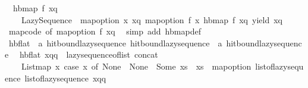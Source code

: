 \begin{isabellebody}
\ \ {\isachardoublequoteopen}hb{\isacharunderscore}{\kern0pt}map\ f\ xq\ {\isacharequal}{\kern0pt}\isanewline
\ \ \ \ Lazy{\isacharunderscore}{\kern0pt}Sequence\ {\isacharparenleft}{\kern0pt}{\isasymlambda}{\isacharunderscore}{\kern0pt}{\isachardot}{\kern0pt}\ map{\isacharunderscore}{\kern0pt}option\ {\isacharparenleft}{\kern0pt}{\isasymlambda}{\isacharparenleft}{\kern0pt}x{\isacharcomma}{\kern0pt}\ xq{\isacharprime}{\kern0pt}{\isacharparenright}{\kern0pt}{\isachardot}{\kern0pt}\ {\isacharparenleft}{\kern0pt}map{\isacharunderscore}{\kern0pt}option\ f\ x{\isacharcomma}{\kern0pt}\ hb{\isacharunderscore}{\kern0pt}map\ f\ xq{\isacharprime}{\kern0pt}{\isacharparenright}{\kern0pt}{\isacharparenright}{\kern0pt}\ {\isacharparenleft}{\kern0pt}yield\ xq{\isacharparenright}{\kern0pt}{\isacharparenright}{\kern0pt}{\isachardoublequoteclose}\isanewline
%
\isadelimproof
\ \ %
\endisadelimproof
%
\isatagproof
{}\isamarkupfalse%
\ map{\isacharunderscore}{\kern0pt}code\ {\isacharbrackleft}{\kern0pt}of\ {\isachardoublequoteopen}map{\isacharunderscore}{\kern0pt}option\ f{\isachardoublequoteclose}\ xq{\isacharbrackright}{\kern0pt}\ \isamarkupfalse%
\ {\isacharparenleft}{\kern0pt}simp\ add{\isacharcolon}{\kern0pt}\ hb{\isacharunderscore}{\kern0pt}map{\isacharunderscore}{\kern0pt}def{\isacharparenright}{\kern0pt}%
\endisatagproof
{\isafoldproof}%
%
\isadelimproof
\isanewline
%
\endisadelimproof
\isanewline
{}\isamarkupfalse%
\ hb{\isacharunderscore}{\kern0pt}flat\ {\isacharcolon}{\kern0pt}{\isacharcolon}{\kern0pt}\ {\isachardoublequoteopen}{\isacharprime}{\kern0pt}a\ hit{\isacharunderscore}{\kern0pt}bound{\isacharunderscore}{\kern0pt}lazy{\isacharunderscore}{\kern0pt}sequence\ hit{\isacharunderscore}{\kern0pt}bound{\isacharunderscore}{\kern0pt}lazy{\isacharunderscore}{\kern0pt}sequence\ {\isasymRightarrow}\ {\isacharprime}{\kern0pt}a\ hit{\isacharunderscore}{\kern0pt}bound{\isacharunderscore}{\kern0pt}lazy{\isacharunderscore}{\kern0pt}sequence{\isachardoublequoteclose}\isanewline
{}\isanewline
\ \ {\isachardoublequoteopen}hb{\isacharunderscore}{\kern0pt}flat\ xqq\ {\isacharequal}{\kern0pt}\ lazy{\isacharunderscore}{\kern0pt}sequence{\isacharunderscore}{\kern0pt}of{\isacharunderscore}{\kern0pt}list\ {\isacharparenleft}{\kern0pt}concat\isanewline
\ \ \ \ {\isacharparenleft}{\kern0pt}List{\isachardot}{\kern0pt}map\ {\isacharparenleft}{\kern0pt}{\isacharparenleft}{\kern0pt}{\isasymlambda}x{\isachardot}{\kern0pt}\ case\ x\ of\ None\ {\isasymRightarrow}\ {\isacharbrackleft}{\kern0pt}None{\isacharbrackright}{\kern0pt}\ {\isacharbar}{\kern0pt}\ Some\ xs\ {\isasymRightarrow}\ xs{\isacharparenright}{\kern0pt}\ {\isasymcirc}\ map{\isacharunderscore}{\kern0pt}option\ list{\isacharunderscore}{\kern0pt}of{\isacharunderscore}{\kern0pt}lazy{\isacharunderscore}{\kern0pt}sequence{\isacharparenright}{\kern0pt}\ {\isacharparenleft}{\kern0pt}list{\isacharunderscore}{\kern0pt}of{\isacharunderscore}{\kern0pt}lazy{\isacharunderscore}{\kern0pt}sequence\ xqq{\isacharparenright}{\kern0pt}{\isacharparenright}{\kern0pt}{\isacharparenright}{\kern0pt}{\isachardoublequoteclose}\isanewline

\end{isabellebody}
